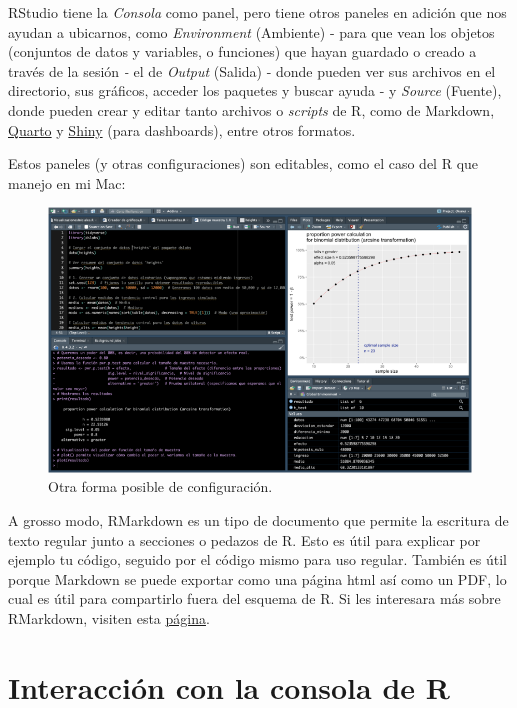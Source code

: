 \documentclass[
]{article}
\begin{document}
RStudio tiene la \emph{Consola} como panel, pero tiene otros paneles en
adición que nos ayudan a ubicarnos, como \emph{Environment} (Ambiente) -
para que vean los objetos (conjuntos de datos y variables, o funciones)
que hayan guardado o creado a través de la sesión \emph{-} el de
\emph{Output} (Salida) - donde pueden ver sus archivos en el directorio,
sus gráficos, acceder los paquetes y buscar ayuda - y \emph{Source}
(Fuente), donde pueden crear y editar tanto archivos o \emph{scripts} de
R, como de Markdown,
\href{https://quarto.org/docs/get-started/hello/rstudio.html}{Quarto} y
\href{https://shiny.posit.co/r/getstarted/shiny-basics/lesson1/index.html}{Shiny}
(para dashboards), entre otros formatos.

Estos paneles (y otras configuraciones) son editables, como el caso del
R que manejo en mi Mac:

\begin{figure}
\centering
\includegraphics{RStudio.png}
\caption{Otra forma posible de configuración.}
\end{figure}

A grosso modo, RMarkdown es un tipo de documento que permite la
escritura de texto regular junto a secciones o pedazos de R. Esto es
útil para explicar por ejemplo tu código, seguido por el código mismo
para uso regular. También es útil porque Markdown se puede exportar como
una página html así como un PDF, lo cual es útil para compartirlo fuera
del esquema de R. Si les interesara más sobre RMarkdown, visiten esta
\href{https://rmarkdown.rstudio.com/lesson-1.html}{página}.

\section{Interacción con la consola de
R}\label{interacciuxf3n-con-la-consola-de-r}
\end{document}
